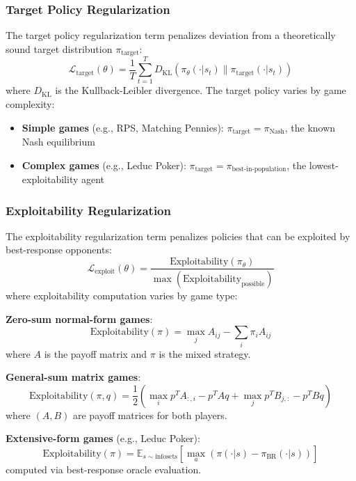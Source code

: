 \documentclass[sigconf,anonymous]{aamas}
\begin{document}
\subsubsection{Target Policy Regularization}
The target policy regularization term penalizes deviation from a theoretically sound target distribution \(\pi_{\text{target}}\):
\begin{equation}
\mathcal{L}_{\text{target}}(\theta) = \frac{1}{T} \sum_{t=1}^T D_{\text{KL}}(\pi_\theta(\cdot|s_t) \parallel \pi_{\text{target}}(\cdot|s_t))
\end{equation}
where \(D_{\text{KL}}\) is the Kullback-Leibler divergence. The target policy varies by game complexity:
\begin{itemize}
\item \textbf{Simple games} (e.g., RPS, Matching Pennies): \(\pi_{\text{target}} = \pi_{\text{Nash}}\), the known Nash equilibrium
\item \textbf{Complex games} (e.g., Leduc Poker): \(\pi_{\text{target}} = \pi_{\text{best-in-population}}\), the lowest-exploitability agent
\end{itemize}

\subsubsection{Exploitability Regularization}
The exploitability regularization term penalizes policies that can be exploited by best-response opponents:
\begin{equation}
\mathcal{L}_{\text{exploit}}(\theta) = \frac{\text{Exploitability}(\pi_\theta)}{\max(\text{Exploitability}_{\text{possible}})}
\end{equation}
where exploitability computation varies by game type:

\textbf{Zero-sum normal-form games}:
\begin{equation}
\text{Exploitability}(\pi) = \max_{j} A_{ij} - \sum_i \pi_i A_{ij}
\end{equation}
where \(A\) is the payoff matrix and \(\pi\) is the mixed strategy.

\textbf{General-sum matrix games}:
\begin{equation}
\text{Exploitability}(\pi, q) = \frac{1}{2} \left( \max_i p^T A_{:,i} - p^T A q + \max_j p^T B_{j,:} - p^T B q \right)
\end{equation}
where \((A, B)\) are payoff matrices for both players.

\textbf{Extensive-form games} (e.g., Leduc Poker):
\begin{equation}
\text{Exploitability}(\pi) = \mathbb{E}_{s \sim \text{infosets}} \left[ \max_a \left( \pi(\cdot|s) - \pi_{\text{BR}}(\cdot|s) \right) \right]
\end{equation}
computed via best-response oracle evaluation.
\end{document}
